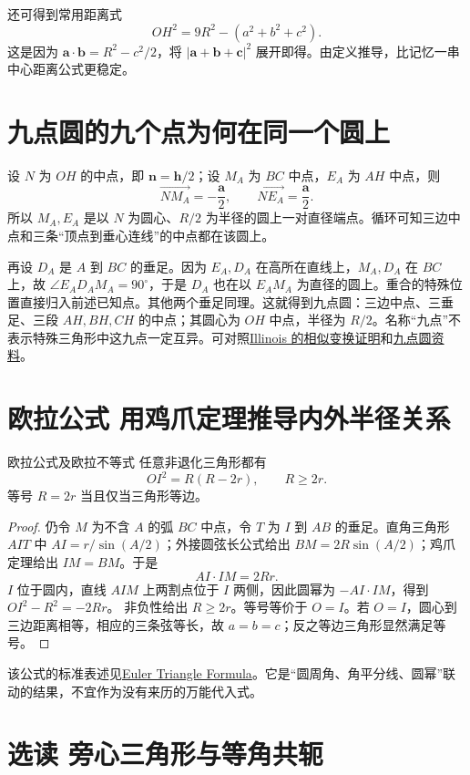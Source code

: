 \documentclass[lang=cn,12pt,fontset=none,a4paper,openany]{beautybook}
\begin{document}
还可得到常用距离式
\[
 OH^2=9R^2-(a^2+b^2+c^2).
\]
这是因为 $\mathbf a\cdot\mathbf b=R^2-c^2/2$，将 $|\mathbf a+\mathbf b+\mathbf c|^2$ 展开即得。由定义推导，比记忆一串中心距离公式更稳定。

\section{九点圆的九个点为何在同一个圆上}
设 $N$ 为 $OH$ 的中点，即 $\mathbf n=\mathbf h/2$；设 $M_A$ 为 $BC$ 中点，$E_A$ 为 $AH$ 中点，则
\[
 \overrightarrow{NM_A}=-\frac{\mathbf a}{2},\qquad
 \overrightarrow{NE_A}=\frac{\mathbf a}{2}.
\]
所以 $M_A,E_A$ 是以 $N$ 为圆心、$R/2$ 为半径的圆上一对直径端点。循环可知三边中点和三条“顶点到垂心连线”的中点都在该圆上。

再设 $D_A$ 是 $A$ 到 $BC$ 的垂足。因为 $E_A,D_A$ 在高所在直线上，$M_A,D_A$ 在 $BC$ 上，故 $\angle E_AD_AM_A=90^\circ$，于是 $D_A$ 也在以 $E_AM_A$ 为直径的圆上。重合的特殊位置直接归入前述已知点。其他两个垂足同理。这就得到九点圆：三边中点、三垂足、三段 $AH,BH,CH$ 的中点；其圆心为 $OH$ 中点，半径为 $R/2$。名称“九点”不表示特殊三角形中这九点一定互异。可对照\href{https://gkfweb.math.illinois.edu/oldnew/math403/public/dilatations/dilatations.html}{Illinois 的相似变换证明}和\href{https://mathworld.wolfram.com/Nine-PointCircle.html}{九点圆资料}。

\section{欧拉公式 用鸡爪定理推导内外半径关系}
\begin{keybox}{欧拉公式及欧拉不等式}
任意非退化三角形都有
\[
 OI^2=R(R-2r),\qquad R\ge2r.
\]
等号 $R=2r$ 当且仅当三角形等边。
\end{keybox}
\begin{proof}
仍令 $M$ 为不含 $A$ 的弧 $BC$ 中点，令 $T$ 为 $I$ 到 $AB$ 的垂足。直角三角形 $AIT$ 中
$AI=r/\sin(A/2)$；外接圆弦长公式给出 $BM=2R\sin(A/2)$；鸡爪定理给出 $IM=BM$。于是
\[
 AI\cdot IM=2Rr.
\]
$I$ 位于圆内，直线 $AIM$ 上两割点位于 $I$ 两侧，因此圆幂为 $-AI\cdot IM$，得到 $OI^2-R^2=-2Rr$。
非负性给出 $R\ge2r$。等号等价于 $O=I$。若 $O=I$，圆心到三边距离相等，相应的三条弦等长，故 $a=b=c$；反之等边三角形显然满足等号。
\end{proof}
该公式的标准表述见\href{https://mathworld.wolfram.com/EulerTriangleFormula.html}{Euler Triangle Formula}。它是“圆周角、角平分线、圆幂”联动的结果，不宜作为没有来历的万能代入式。

\section{选读 旁心三角形与等角共轭}
\end{document}

